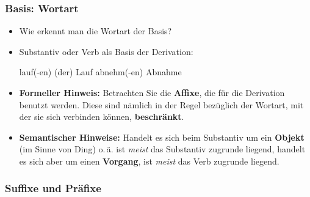 
\begin{frame}
\frametitle{Basis: Wortart}

\begin{itemize}
	\item Wie erkennt man die Wortart der Basis?
	
		\item Substantiv oder Verb als Basis der Derivation:
		
		\eal 
			\ex lauf(-en) \ras (der) Lauf
			\ex abnehm(-en) \ras Abnahme
		\zl


		\item \textbf{Formeller Hinweis:} Betrachten Sie die \textbf{Affixe}, die für die Derivation benutzt werden. Diese sind nämlich in der Regel bezüglich der Wortart, mit der sie sich verbinden können, \textbf{beschränkt}.
		
\medskip
				
		\item \textbf{Semantischer Hinweise:} Handelt es sich beim Substantiv um ein \textbf{Objekt} (im Sinne von Ding) o.\,ä. ist \emph{meist} das Substantiv zugrunde liegend, handelt es sich aber um einen \textbf{Vorgang}, ist \emph{meist} das Verb zugrunde liegend.
		
%	
\end{itemize}


\end{frame}


\subsubsection{Suffixe und Präfixe}

